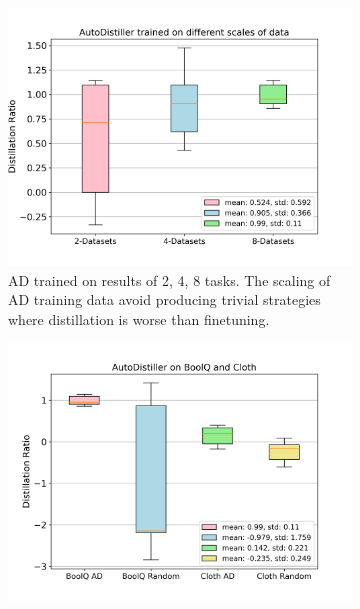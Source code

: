 \documentclass[11pt]{article}
\begin{document}
\begin{figure}[!tb]
    \centering
    \begin{subfigure}[b]{0.4\textwidth}
    \centering
    \includegraphics[width=1.0\textwidth]{pics/autodistiller_xscale_scracth.png}
    \caption{AD trained on results of 2, 4, 8 tasks. The scaling of AD training data avoid producing trivial strategies where distillation is worse than finetuning.
    }
    \label{fig:AD:more-data}
    \end{subfigure}
    \begin{subfigure}[b]{0.40\textwidth}
    \centering
    \includegraphics[width=1.0\textwidth]{pics/AD_prediction_scracth.png}

\end{subfigure}
\end{figure}
\end{document}
